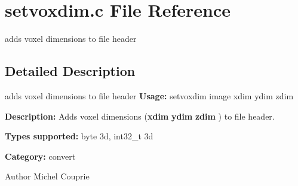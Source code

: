 \section{setvoxdim.c File Reference}
\label{setvoxdim_8c}


adds voxel dimensions to file header  




\subsection{Detailed Description}
adds voxel dimensions to file header {\bfseries Usage:} setvoxdim image xdim ydim zdim

{\bfseries Description:} Adds voxel dimensions ({\bfseries xdim} {\bfseries ydim} {\bfseries zdim} ) to file header.

{\bfseries Types supported:} byte 3d, int32\_\-t 3d

{\bfseries Category:} convert

\begin{DoxyAuthor}{Author}
Michel Couprie 
\end{DoxyAuthor}

